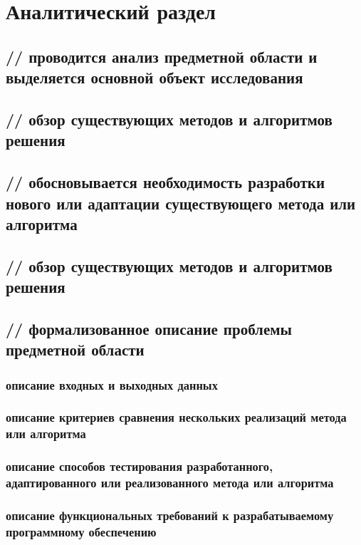 \chapter{Аналитический раздел}


\section{// проводится анализ предметной области и выделяется основной объект исследования}
\section{// обзор существующих методов и алгоритмов решения}
\section{// обосновывается необходимость разработки нового или адаптации существующего метода или алгоритма}
\section{// обзор существующих методов и алгоритмов решения}
\section{// формализованное описание проблемы предметной области}
\subsection{описание входных и выходных данных}
\subsection{описание критериев сравнения нескольких реализаций метода или алгоритма}
\subsection{описание способов тестирования разработанного, адаптированного или
реализованного метода или алгоритма}
\subsection{описание функциональных требований к разрабатываемому программному
обеспечению}